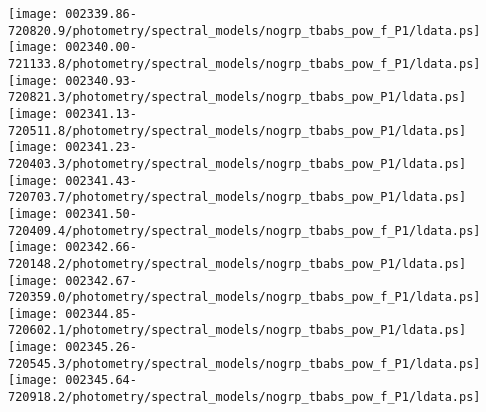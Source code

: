 \documentclass{aastex}
\begin{document}
\begin{figure*}[!ht]
\centering
\texttt{[image: 002339.86-720820.9/photometry/spectral\_models/nogrp\_tbabs\_pow\_f\_P1/ldata.ps]} \hfill 
\texttt{[image: 002340.00-721133.8/photometry/spectral\_models/nogrp\_tbabs\_pow\_f\_P1/ldata.ps]} \hfill 
\texttt{[image: 002340.93-720821.3/photometry/spectral\_models/nogrp\_tbabs\_pow\_P1/ldata.ps]} \\ 
\vspace*{0.5in}
\texttt{[image: 002341.13-720511.8/photometry/spectral\_models/nogrp\_tbabs\_pow\_P1/ldata.ps]} \hfill 
\texttt{[image: 002341.23-720403.3/photometry/spectral\_models/nogrp\_tbabs\_pow\_P1/ldata.ps]} \hfill 
\texttt{[image: 002341.43-720703.7/photometry/spectral\_models/nogrp\_tbabs\_pow\_P1/ldata.ps]} \\ 
\vspace*{0.5in}
\texttt{[image: 002341.50-720409.4/photometry/spectral\_models/nogrp\_tbabs\_pow\_f\_P1/ldata.ps]} \hfill 
\texttt{[image: 002342.66-720148.2/photometry/spectral\_models/nogrp\_tbabs\_pow\_P1/ldata.ps]} \hfill 
\texttt{[image: 002342.67-720359.0/photometry/spectral\_models/nogrp\_tbabs\_pow\_f\_P1/ldata.ps]} \\ 
\vspace*{0.5in}
\texttt{[image: 002344.85-720602.1/photometry/spectral\_models/nogrp\_tbabs\_pow\_P1/ldata.ps]} \hfill 
\texttt{[image: 002345.26-720545.3/photometry/spectral\_models/nogrp\_tbabs\_pow\_f\_P1/ldata.ps]} \hfill 
\texttt{[image: 002345.64-720918.2/photometry/spectral\_models/nogrp\_tbabs\_pow\_f\_P1/ldata.ps]} \\ 
\vspace*{0.5in}
\end{figure*}
\clearpage
\end{document}
